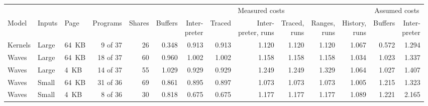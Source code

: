 \begin{tabular}{lllrrrrrrrrrrr}
\toprule
 & & & & & \multicolumn{7}{c}{Measured costs} & \multicolumn{2}{c}{Assumed costs} \\
\cmidrule(lr){6-12} \cmidrule(lr){13-14}
Model & Inputs & Page & Programs & Shares & Buffers & \shortstack{Inter-\\preter} & Traced & \shortstack{Inter-\\preter, runs} & \shortstack{Traced,\\runs} & \shortstack{Ranges,\\runs} & \shortstack{History,\\runs} & Buffers & \shortstack{Inter-\\preter} \\
\midrule
Kernels & Large & 64~KB & 9 of 37 & 26 & 0.348 & 0.913 & 0.913 & 1.120 & 1.120 & 1.120 & 1.067 & 0.572 & 1.294 \\
Waves & Large & 64~KB & 18 of 37 & 60 & 0.960 & 1.002 & 1.002 & 1.158 & 1.158 & 1.158 & 1.034 & 1.023 & 1.337 \\
Waves & Large & 4~KB & 14 of 37 & 55 & 1.029 & 0.929 & 0.929 & 1.249 & 1.249 & 1.329 & 1.064 & 1.027 & 1.407 \\
Waves & Small & 64~KB & 31 of 36 & 69 & 0.861 & 0.895 & 0.897 & 1.073 & 1.073 & 1.073 & 1.005 & 1.215 & 1.323 \\
Waves & Small & 4~KB & 8 of 36 & 30 & 0.818 & 0.675 & 0.675 & 1.177 & 1.177 & 1.177 & 1.089 & 1.221 & 2.165 \\
\bottomrule
\end{tabular}
